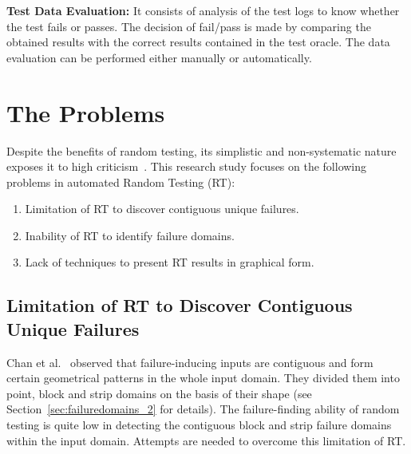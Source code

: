 \textbf{Test Data Evaluation:} It consists of analysis of the test logs to know whether the test fails or passes. The decision of fail/pass is made by comparing the obtained results with the correct results contained in the test oracle. The data evaluation can be performed either manually or automatically.

%

\section{The Problems}
Despite the benefits of random testing, its simplistic and non-systematic nature exposes it to high criticism~\cite{myers2011art, white1987software}. This research study focuses on the following problems in automated Random Testing (RT):


\begin{enumerate}
\item Limitation of RT to discover contiguous unique failures.
\item Inability of RT to identify failure domains.
\item Lack of techniques to present RT results in graphical form.
\end{enumerate}

\subsection{Limitation of RT to Discover Contiguous Unique Failures}
Chan et al.~\cite{chan1996proportional} observed that failure-inducing inputs are contiguous and form certain geometrical patterns in the whole input domain. They divided them into point, block and strip domains on the basis of their shape (see Section~\ref{sec:failuredomains_2} for details). %
The failure-finding ability of random testing is quite low in detecting the contiguous block and strip failure domains within the input domain. Attempts are needed to overcome this limitation of RT.

